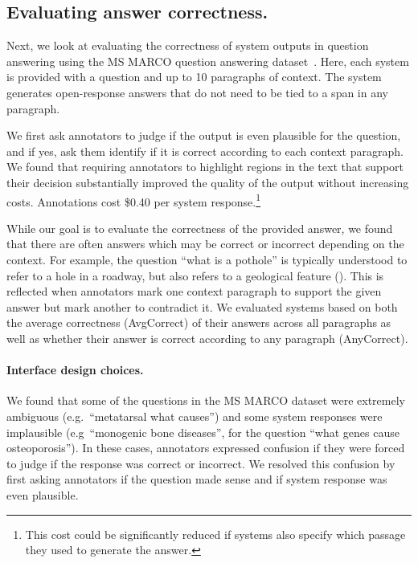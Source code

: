 \subsection{Evaluating answer correctness.}
Next, we look at evaluating the correctness of system outputs in question answering using the MS MARCO question answering dataset~\citep{nguyen2016ms}.
Here, each system is provided with a question and up to 10 paragraphs of context.
The system generates open-response answers that do not need to be tied to a span in any paragraph.

We first ask annotators to judge if the output is even plausible for the question,
and if yes,
ask them identify if it is correct according to each context paragraph. 
We found that requiring annotators to highlight regions in the text that support their decision
substantially improved the quality of the output without increasing costs.
Annotations cost \$0.40 per system response.\footnote{%
  This cost could be significantly reduced if systems also specify which passage they used to generate the answer.
}

While our goal is to evaluate the correctness of the provided answer, we found that there are often answers which may be correct or incorrect depending on the context.
For example, the question ``what is a pothole'' is typically understood to refer to a hole in a roadway, but also refers to a geological feature ().
This is reflected when annotators mark one context paragraph to support the given answer but mark another to contradict it.
We evaluated systems based on both the average correctness (AvgCorrect) of their answers across all paragraphs
as well as whether their answer is correct according to any paragraph (AnyCorrect).

\paragraph{Interface design choices.}
We found that some of the questions in the MS MARCO dataset were extremely ambiguous (e.g.\ ``metatarsal what causes'') and some system responses were implausible (e.g\ ``monogenic bone diseases'', for the question ``what genes cause osteoporosis'').
In these cases, annotators expressed confusion if they were forced to judge if the response was correct or incorrect.
We resolved this confusion by first asking annotators if the question made sense and if system response was even plausible.

